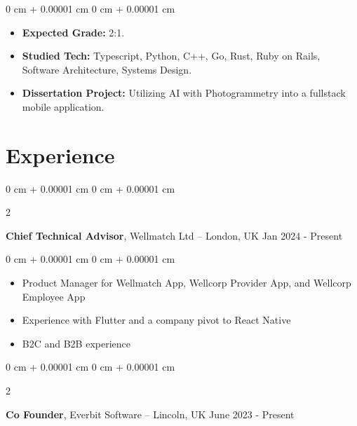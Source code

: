 \documentclass[10pt, letterpaper]{article}
\newenvironment{highlights}{
    \begin{itemize}[
        topsep=0.10 cm,
        parsep=0.10 cm,
        partopsep=0pt,
        itemsep=0pt,
        leftmargin=0 cm + 10pt
    ]
}{
    \end{itemize}
} %
\newenvironment{onecolentry}{
    \begin{adjustwidth}{
        0 cm + 0.00001 cm
    }{
        0 cm + 0.00001 cm
    }
}{
    \end{adjustwidth}
} %
\newenvironment{twocolentry}[2][]{
    \onecolentry
    \def\secondColumn{#2}
    \setcolumnwidth{\fill, 4.5 cm}
    \begin{paracol}{2}
}{
    \switchcolumn \raggedleft \secondColumn
    \end{paracol}
    \endonecolentry
} %
\begin{document}
        \vspace{0.10 cm}
        \begin{onecolentry}
            \begin{highlights}
                \item \textbf{Expected Grade:} 2:1.
                \item \textbf{Studied Tech:} Typescript, Python, C++, Go, Rust, Ruby on Rails, Software Architecture, Systems Design.
                \item \textbf{Dissertation Project:} Utilizing AI with Photogrammetry into a fullstack mobile application.
            \end{highlights}
        \end{onecolentry}
    
    \section{Experience}

        \begin{twocolentry}{
            Jan 2024 - Present
        }
            \textbf{Chief Technical Advisor}, Wellmatch Ltd -- London, UK\end{twocolentry}

        \vspace{0.10 cm}
        \begin{onecolentry}
            \begin{highlights}
                \item Product Manager for Wellmatch App, Wellcorp Provider App, and Wellcorp Employee App
                \item Experience with Flutter and a company pivot to React Native
                \item B2C and B2B experience
            \end{highlights}
        \end{onecolentry}

        \begin{twocolentry}{
            June 2023 - Present
        }
            \textbf{Co Founder}, Everbit Software -- Lincoln, UK\end{twocolentry}
\end{document}
